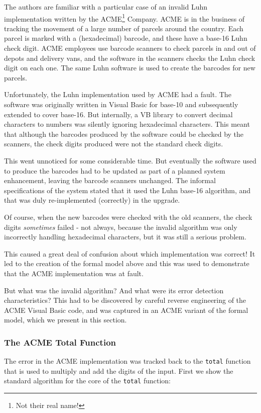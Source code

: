 \documentclass{overturerepchap}
\begin{document}
The authors are familiar with a particular case of an invalid Luhn
implementation written by the ACME\footnote{Not their real name!} Company. ACME
is in the business of tracking the movement of a large number of parcels around
the country. Each parcel is marked with a (hexadecimal) barcode, and these have
a base-16 Luhn check digit. ACME employees use barcode scanners to check
parcels in and out of depots and delivery vans, and the software in the
scanners checks the Luhn check digit on each one. The same Luhn software is
used to create the barcodes for new parcels.

Unfortunately, the Luhn implementation used by ACME had a fault. The software
was originally written in Visual Basic for base-10 and subsequently extended to
cover base-16. But internally, a VB library to convert decimal characters to
numbers was silently ignoring hexadecimal characters. This meant that although
the barcodes produced by the software could be checked by the scanners, the
check digits produced were not the standard check digits.

This went unnoticed for some considerable time. But eventually the software
used to produce the barcodes had to be updated as part of a planned system
enhancement, leaving the barcode scanners unchanged. The informal specifications
of the system stated that it used the Luhn base-16 algorithm, and that was duly
re-implemented (correctly) in the upgrade.

Of course, when the new barcodes were checked with the old scanners, the check
digits \emph{sometimes} failed - not always, because the invalid algorithm was
only incorrectly handling hexadecimal characters, but it was still a serious
problem.

This caused a great deal of confusion about which implementation was correct! It
led to the creation of the formal model above and this was used to demonstrate
that the ACME implementation was at fault.

But what was the invalid algorithm? And what were its error detection
characteristics? This had to be discovered by careful reverse engineering of the
ACME Visual Basic code, and was captured in an ACME variant of the formal model,
which we present in this section.

\subsubsection{The ACME Total Function}

The error in the ACME implementation was tracked back to the \texttt{total}
function that is used to multiply and add the digits of the input. First we
show the standard algorithm for the core of the \texttt{total} function:
\end{document}
